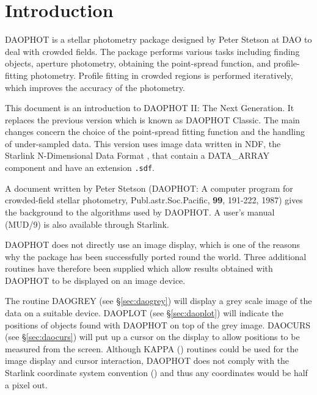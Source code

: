 \stardocabstract
 \newpage
 \begin{latexonly}
   \setlength{\parskip}{0mm}
   \latexonlytoc
   \setlength{\parskip}{\medskipamount}
   \markright{\stardocname}
 \end{latexonly}
\newpage
\renewcommand{\thepage}{\arabic{page}}
\setcounter{page}{1}

\section{Introduction}
\label{sec:intro}

DAOPHOT is a stellar photometry package designed by Peter Stetson at DAO to deal
with crowded fields. The package performs various tasks including
finding objects, aperture photometry, obtaining the point-spread function, and
profile-fitting photometry. Profile fitting in crowded regions is performed
iteratively, which improves the accuracy of the photometry.

This document is an introduction to DAOPHOT II: The Next Generation. It replaces
the previous version which is known as DAOPHOT Classic. The main changes concern
the choice of the point-spread fitting function and the handling of under-sampled
data. This version uses image data written in NDF, the Starlink N-Dimensional
Data Format , that contain a DATA\_ARRAY component
and have an extension {\tt .sdf}.

A document written by Peter Stetson (DAOPHOT: A computer program for crowded-field
stellar photometry, Publ.astr.Soc.Pacific, {\bf 99}, 191-222, 1987)
gives the background to the algorithms used by DAOPHOT. A user's manual (MUD/9)
is also available through Starlink.

DAOPHOT does not directly use an image display, which is one of the reasons why the
package has been successfully ported round the world. Three additional routines
have therefore been supplied which allow results obtained with DAOPHOT to be
displayed on an image device.

The routine DAOGREY (see \S{\ref{sec:daogrey}})
will display a grey scale image of the data on a suitable
device. DAOPLOT (see \S{\ref{sec:daoplot}})
will indicate the positions of objects found with DAOPHOT on top of
the grey image. DAOCURS (see \S{\ref{sec:daocurs}})
will put up a cursor on the display to allow positions to
be measured from the screen. Although KAPPA () routines could
be used for the image display and cursor interaction, DAOPHOT does not comply with
the Starlink coordinate system convention () and thus any
coordinates would be half a pixel out.

